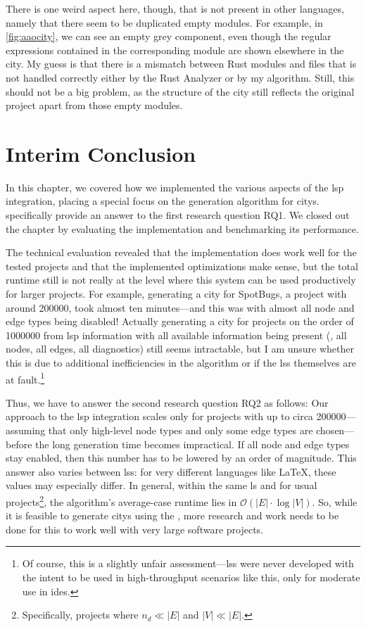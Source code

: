 \documentclass[../thesis]{subfiles}
\begin{document}
There is one weird aspect here, though, that is not present in other languages, namely that there seem to be duplicated empty modules.
For example, in \cref{fig:aaocity}, we can see an empty grey  component, even though the regular expressions contained in the corresponding module are shown elsewhere in the city.
My guess is that there is a mismatch between Rust modules and files that is not handled correctly either by the Rust Analyzer or by my algorithm.
Still, this should not be a big problem, as the structure of the \gls{city} still reflects the original project apart from those empty modules.

\section{Interim Conclusion}\label{sec:implconclusion}
In this chapter, we covered how we implemented the various aspects of the \gls{lsp} integration, placing a special focus on the generation algorithm for \glspl{city}.
 specifically provide an answer to the first research question \textsf{RQ1}.
We closed out the chapter by evaluating the implementation and benchmarking its performance.

The technical evaluation revealed that the implementation does work well for the tested projects and that the implemented optimizations make sense, but the total runtime still is not really at the level where this system can be used productively for larger projects.
For example, generating a city for SpotBugs, a project with around \qty{200000}{\loc}, took almost ten minutes---and this was with almost all node and edge types being disabled!
Actually generating a \gls{city} for projects on the order of \qty{1000000}{\loc} from \gls{lsp} information with all available information being present (\ie, all nodes, all edges, all diagnostics) still seems intractable, but I am unsure whether this is due to additional inefficiencies in the algorithm or if the \glspl{ls} themselves are at fault.\footnote{
	Of course, this is a slightly unfair assessment---\glspl{ls} were never developed with the intent to be used in high-throughput scenarios like this, only for moderate use in \glspl{ide}.
}

Thus, we have to answer the second research question \textsf{RQ2} as follows:
Our approach to the \gls{lsp} integration scales only for projects with up to circa \qty{200000}{\loc}---assuming that only high-level node types and only some edge types are chosen---before the long generation time becomes impractical.
If all node and edge types stay enabled, then this number has to be lowered by an order of magnitude.
This answer also varies between \glspl{ls}: for very different languages like \LaTeX{}, these values may especially differ.
In general, within the same \gls{ls} and for usual projects\footnote{
	Specifically, projects where $n_d \ll |E|$ and $|V| \ll |E|$.
}, the algorithm's average-case runtime lies in $\mathcal{O}(|E| \cdot \log |V|)$.
So, while it is feasible to generate \glspl{city} using the , more research and work needs to be done for this to work well with very large software projects.
\end{document}
